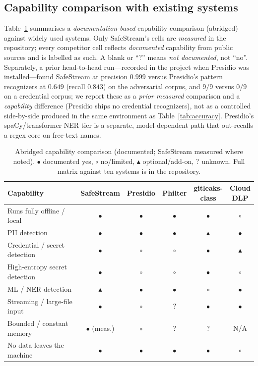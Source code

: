 \documentclass[runningheads]{llncs}
\begin{document}
\subsection{Capability comparison with existing systems}
Table~\ref{tab:capability} summarises a \emph{documentation-based} capability
comparison (abridged) against widely used systems. Only SafeStream's cells are
\emph{measured} in the repository; every competitor cell reflects
\emph{documented} capability from public sources and is labelled as such. A blank
or ``?'' means \emph{not documented}, not ``no''. Separately, a prior head-to-head
run---recorded in the project when Presidio was installed---found SafeStream at
precision $0.999$ versus Presidio's pattern recognizers at $0.649$ (recall
$0.843$) on the adversarial corpus, and $9/9$ versus $0/9$ on a credential
corpus; we report these as a \emph{prior measured} comparison and a
\emph{capability} difference (Presidio ships no credential recognizers), not as a
controlled side-by-side produced in the same environment as
Table~\ref{tab:accuracy}. Presidio's spaCy/transformer NER tier is a separate,
model-dependent path that out-recalls a regex core on free-text names.

\begin{table}[t]
\centering
\caption{Abridged capability comparison (documented; SafeStream measured where
noted). $\bullet$ documented yes, $\circ$ no/limited, $\blacktriangle$
optional/add-on, ? unknown. Full matrix against ten systems is in the
repository.}
\label{tab:capability}
\setlength{\tabcolsep}{3.5pt}
\begin{tabular}{@{}lccccc@{}}
\toprule
Capability & SafeStream & Presidio & Philter & \makecell{gitleaks-\\class} & \makecell{Cloud\\DLP} \\
\midrule
Runs fully offline / local      & $\bullet$ & $\bullet$ & $\bullet$ & $\bullet$ & $\circ$ \\
PII detection                   & $\bullet$ & $\bullet$ & $\bullet$ & $\blacktriangle$ & $\bullet$ \\
Credential / secret detection   & $\bullet$ & $\circ$ & $\circ$ & $\bullet$ & $\blacktriangle$ \\
High-entropy secret detection   & $\bullet$ & $\circ$ & $\circ$ & $\bullet$ & $\circ$ \\
ML / NER detection              & $\blacktriangle$ & $\bullet$ & $\bullet$ & $\circ$ & $\bullet$ \\
Streaming / large-file input    & $\bullet$ & $\circ$ & ? & $\bullet$ & $\bullet$ \\
Bounded / constant memory       & $\bullet$ (meas.) & $\circ$ & ? & ? & N/A \\
No data leaves the machine      & $\bullet$ & $\bullet$ & $\bullet$ & $\bullet$ & $\circ$ \\
\bottomrule
\end{tabular}
\end{table}
\end{document}
